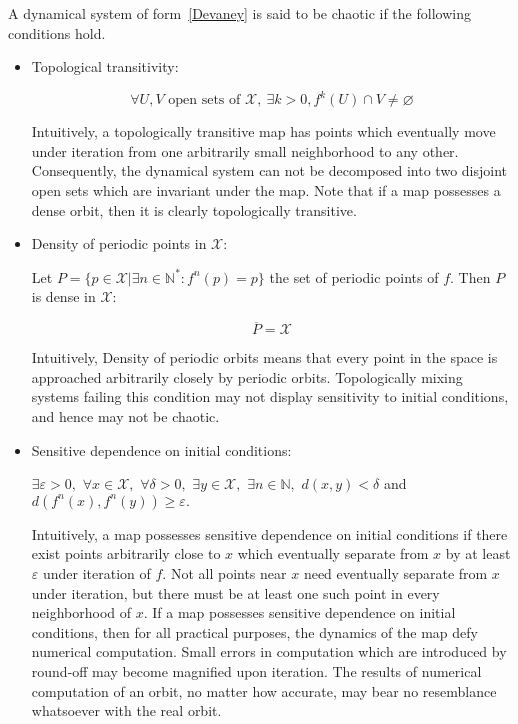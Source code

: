 \begin{definition}
 A dynamical system of form~\ref{Devaney} is said to be chaotic if the following conditions hold.
\begin{itemize}
\item Topological transitivity:

\begin{equation}
\forall U,V \textrm{ open sets of } \mathcal{X}, ~\exists k>0, f^k(U) \cap V \neq \varnothing
\end{equation}

Intuitively, a topologically transitive map has points which eventually move under iteration from one arbitrarily small neighborhood to any other. Consequently, the dynamical system can not be decomposed into two disjoint open sets which are invariant under the map. Note that if a map possesses a dense orbit, then it is clearly topologically transitive.
\item Density of periodic points in $\mathcal{X}$:

Let $P=\{p\in \mathcal{X}|\exists n \in \mathds{N}^{\ast}:f^n(p)=p\}$ the set of periodic points of $f$. Then $P$ is dense in $\mathcal{X}$:

\begin{equation}
 \overline{P}=\mathcal{X}
\end{equation}

Intuitively, Density of periodic orbits means that every point in the space is approached arbitrarily closely by periodic orbits. Topologically mixing systems failing this condition may not display sensitivity to initial conditions, and hence may not be chaotic.
\item Sensitive dependence on initial conditions:

$\exists \varepsilon>0,$ $\forall x \in \mathcal{X},$ $\forall \delta >0,$ $\exists y \in \mathcal{X},$ $\exists n \in \mathbb{N},$ $d(x,y)<\delta$ and $d\left(f^n(x),f^n(y)\right) \geqslant \varepsilon.$

Intuitively, a map possesses sensitive dependence on initial conditions if there exist points arbitrarily close to $x$ which eventually separate from $x$ by at least $\varepsilon$ under iteration of $f$. Not all points near $x$ need eventually separate from $x$ under iteration, but there must be at least one such point in every neighborhood of $x$. If a map possesses sensitive dependence on initial conditions, then for all practical purposes, the dynamics of the map defy numerical computation. Small errors in computation which are introduced by round-off may become magnified upon iteration. The results of numerical computation of an orbit, no matter how accurate, may bear no resemblance whatsoever with the real orbit.
\end{itemize}

\end{definition}
